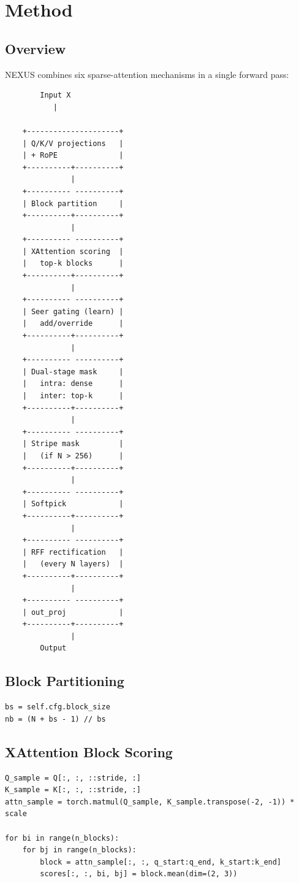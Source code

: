 \section{Method}

\subsection{Overview}

NEXUS combines six sparse-attention mechanisms in a single forward pass:

\begin{lstlisting}
        Input X
           |
            
    +---------------------+
    | Q/K/V projections   |
    | + RoPE              |
    +----------+----------+
               |
    +---------- ----------+
    | Block partition     |
    +----------+----------+
               |
    +---------- ----------+
    | XAttention scoring  |
    |   top-k blocks      |
    +----------+----------+
               |
    +---------- ----------+
    | Seer gating (learn) |
    |   add/override      |
    +----------+----------+
               |
    +---------- ----------+
    | Dual-stage mask     |
    |   intra: dense      |
    |   inter: top-k      |
    +----------+----------+
               |
    +---------- ----------+
    | Stripe mask         |
    |   (if N > 256)      |
    +----------+----------+
               |
    +---------- ----------+
    | Softpick            |
    +----------+----------+
               |
    +---------- ----------+
    | RFF rectification   |
    |   (every N layers)  |
    +----------+----------+
               |
    +---------- ----------+
    | out_proj            |
    +----------+----------+
               |
        Output
\end{lstlisting}

\subsection{Block Partitioning}

\begin{lstlisting}
bs = self.cfg.block_size
nb = (N + bs - 1) // bs
\end{lstlisting}

\subsection{XAttention Block Scoring}

\begin{lstlisting}
Q_sample = Q[:, :, ::stride, :]
K_sample = K[:, :, ::stride, :]
attn_sample = torch.matmul(Q_sample, K_sample.transpose(-2, -1)) * scale

for bi in range(n_blocks):
    for bj in range(n_blocks):
        block = attn_sample[:, :, q_start:q_end, k_start:k_end]
        scores[:, :, bi, bj] = block.mean(dim=(2, 3))
\end{lstlisting}

